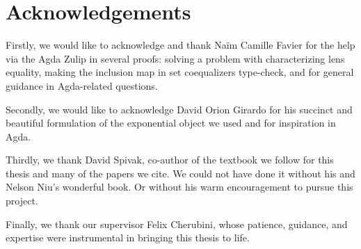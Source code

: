 \thispagestyle{plain}			%
\section{Acknowledgements}
Firstly, we would like to acknowledge and thank Naïm Camille Favier for the help via the Agda Zulip in several proofs: solving a problem with characterizing lens equality, making the inclusion map in set coequalizers type-check, and for general guidance in Agda-related questions.


Secondly, we would like to acknowledge David Orion Girardo for his succinct and beautiful formulation of the exponential object we used and for inspiration in Agda.


Thirdly, we thank David Spivak, co-author of the textbook we follow for this thesis and many of the papers we cite. We could not have done it without his and Nelson Niu's wonderful book. Or without his warm encouragement to pursue this project.

Finally, we thank our supervisor Felix Cherubini, whose patience, guidance, and expertise were instrumental in bringing this thesis to life.


\newpage				%
\thispagestyle{empty}
\mbox{}